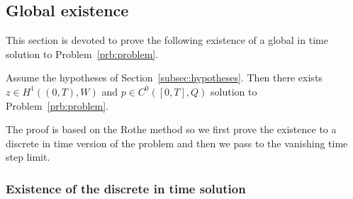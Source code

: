 \subsection{Global existence}
\label{subsec:existence}

This section is devoted to prove the following existence of a global in time solution to Problem~\ref{prb:problem}.
\begin{thm}
\label{thm:global-existence}
Assume the hypotheses of Section~\ref{subsec:hypotheses}. Then there exists $z\in H^1((0,T),W)$ and $p\in C^0([0,T],Q)$ solution to Problem~\ref{prb:problem}.
\end{thm}
The proof is based on the Rothe method so we first prove the existence to a discrete in time version of the problem and then we pass to the vanishing time step limit. 

\subsubsection*{Existence of the discrete in time solution}

